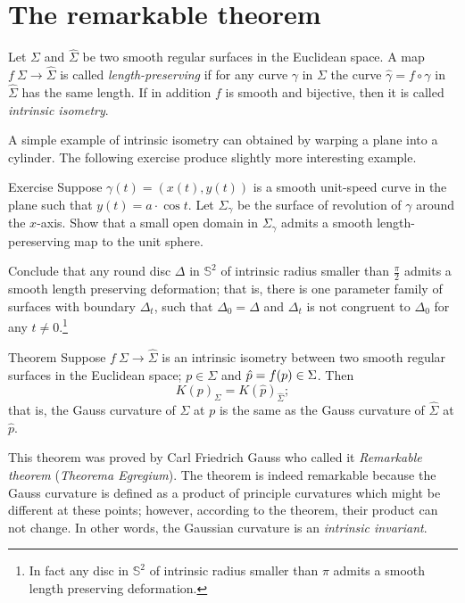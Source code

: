 \section{The remarkable theorem}

Let $\Sigma$ and $\hat{\Sigma}$ be two smooth regular surfaces in the Euclidean space.
A map $f\:\Sigma\to \hat{\Sigma}$ is called  \emph{length-preserving} if for any curve $\gamma$ in $\Sigma$ the curve $\hat\gamma=f\circ\gamma$ in $\hat{\Sigma}$ has the same length. %
If in addition $f$ is smooth and bijective, then it is called \emph{intrinsic isometry}. 

A simple example of intrinsic isometry can obtained by warping a plane into a cylinder.
The following exercise produce slightly more interesting example.


\begin{thm}{Exercise}\label{ex:deformation}
Suppose $\gamma(t)=(x(t),y(t))$ is a smooth unit-speed curve in the plane such that $y(t)=a\cdot \cos t$.
Let $\Sigma_\gamma$ be the surface of revolution of $\gamma$ around the $x$-axis.
Show that a small open domain in $\Sigma_\gamma$ admits a smooth length-pereserving map to the unit sphere.

Conclude that any round disc $\Delta$ in $\mathbb{S}^2$ of intrinsic radius smaller than $\tfrac\pi2$ admits a smooth length preserving deformation; that is, there is one parameter family of surfaces with boundary $\Delta_t$, such that $\Delta_0=\Delta$ and $\Delta_t$ is not congruent to $\Delta_0$ for any $t\ne0$.\footnote{In fact any disc in $\mathbb{S}^2$ of intrinsic radius smaller than $\pi$ admits a smooth length preserving deformation. %
}
\end{thm}


\begin{thm}{Theorem}\label{thm:remarkable}
Suppose $f\:\Sigma\to \hat{\Sigma}$ is an intrinsic isometry between two smooth regular surfaces in  the Euclidean space; $p\in \Sigma$ and $\hat p\z=f(p)\in \Sigma$.
Then 
\[K(p)_{\Sigma}=K(\hat p)_{\hat{\Sigma}};\]
that is, the Gauss curvature of $\Sigma$ at $p$ is the same as the Gauss curvature of $\hat{\Sigma}$ at $\hat p$.
\end{thm}

This theorem was proved by Carl Friedrich Gauss \cite{gauss} who called it \emph{Remarkable theorem} (\emph{Theorema Egregium}).
The theorem is indeed remarkable because the Gauss curvature is defined as a product of principle curvatures which might be different at these points; however, according to the theorem, their product can not change.
In other words, the Gaussian curvature is an {}\emph{intrinsic invariant}.


